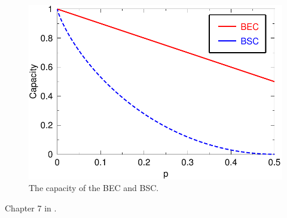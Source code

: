 \begin{figure}[h]
\begin{center}
\includegraphics[width=\linewidth]{figures/becbsc.pdf}
\caption{The capacity of the BEC and BSC.}
\label{fig:becbsc}
\end{center}
\end{figure}
{}

Chapter 7 in \cite{Cover_91}. 
